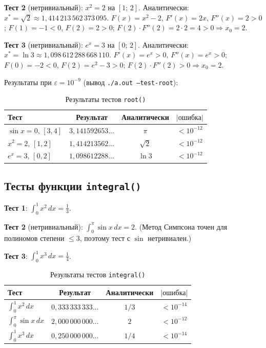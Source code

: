 \documentclass[a4paper,12pt,titlepage,finall]{article}
\begin{document}
\textbf{Тест 2} (нетривиальный): $x^2 = 2$ на $[1;\,2]$.
Аналитически: $x^* = \sqrt{2}\approx 1{,}414\,213\,562\,373\,095$.
$F(x)=x^2-2$, $F'(x)=2x$, $F''(x)=2>0$;
$F(1)=-1<0$, $F(2)=2>0$;
$F(2)\cdot F''(2)=2\cdot2=4>0 \Rightarrow x_0=2$.

\textbf{Тест 3} (нетривиальный): $e^x = 3$ на $[0;\,2]$.
Аналитически: $x^* = \ln 3\approx 1{,}098\,612\,288\,668\,110$.
$F'(x)=e^x>0$, $F''(x)=e^x>0$;
$F(0)=-2<0$, $F(2)=e^2-3>0$;
$F(2)\cdot F''(2)>0 \Rightarrow x_0=2$.

Результаты при $\varepsilon=10^{-9}$ (вывод \texttt{./a.out --test-root}):

\begin{table}[h]
\centering
\begin{tabular}{|l|c|c|c|}
\hline
Тест & Результат & Аналитически & $|\text{ошибка}|$ \\
\hline
$\sin x=0,\,[3,4]$  & $3{,}141592653\ldots$ & $\pi$ & $<10^{-12}$ \\
$x^2=2,\,[1,2]$     & $1{,}414213562\ldots$ & $\sqrt{2}$ & $<10^{-12}$ \\
$e^x=3,\,[0,2]$     & $1{,}098612288\ldots$ & $\ln 3$ & $<10^{-12}$ \\
\hline
\end{tabular}
\caption{Результаты тестов \texttt{root()}}
\label{table3}
\end{table}

\subsection{Тесты функции \texttt{integral()}}

\textbf{Тест 1}: $\displaystyle\int_0^1 x^2\,dx = \frac{1}{3}$.

\textbf{Тест 2} (нетривиальный): $\displaystyle\int_0^\pi \sin x\,dx = 2$.
(Метод Симпсона точен для полиномов степени $\le 3$,
поэтому тест с $\sin$ нетривиален.)

\textbf{Тест 3}: $\displaystyle\int_0^1 x^3\,dx = \frac{1}{4}$.

\begin{table}[h]
\centering
\begin{tabular}{|l|c|c|c|}
\hline
Тест & Результат & Аналитически & $|\text{ошибка}|$ \\
\hline
$\int_0^1 x^2\,dx$     & $0{,}333\,333\,333\ldots$ & $1/3$   & $<10^{-14}$ \\
$\int_0^\pi \sin x\,dx$ & $2{,}000\,000\,000\ldots$ & $2$     & $<10^{-12}$ \\
$\int_0^1 x^3\,dx$     & $0{,}250\,000\,000\ldots$ & $1/4$   & $<10^{-14}$ \\
\hline
\end{tabular}
\caption{Результаты тестов \texttt{integral()}}
\label{table4}
\end{table}
\end{document}
